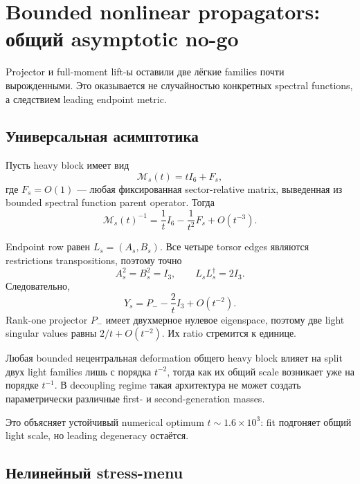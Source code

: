 \chapter{Bounded nonlinear propagators: общий asymptotic no-go}

Projector и full-moment lift-ы оставили две лёгкие families почти
вырожденными. Это оказывается не случайностью конкретных spectral functions,
а следствием leading endpoint metric.

\section{Универсальная асимптотика}

Пусть heavy block имеет вид
\begin{equation}
 \mathcal M_s(t)=tI_6+F_s,
\end{equation}
где \(F_s=O(1)\) --- любая фиксированная sector-relative matrix, выведенная
из bounded spectral function parent operator. Тогда
\begin{equation}
 \mathcal M_s(t)^{-1}=\frac1tI_6-\frac1{t^2}F_s+O(t^{-3}).
\end{equation}

Endpoint row равен \(L_s=(A_s,B_s)\). Все четыре torsor edges являются
restrictions transpositions, поэтому точно
\begin{equation}
 A_s^2=B_s^2=I_3,
 \qquad
 L_sL_s^\dagger=2I_3.
\end{equation}
Следовательно,
\begin{equation}
 Y_s=P_--\frac2tI_3+O(t^{-2}).
\end{equation}
Rank-one projector \(P_-\) имеет двухмерное нулевое eigenspace, поэтому две
light singular values равны \(2/t+O(t^{-2})\). Их ratio стремится к единице.

\begin{theorem}
Любая bounded нецентральная deformation общего heavy block влияет на split
двух light families лишь с порядка \(t^{-2}\), тогда как их общий scale
возникает уже на порядке \(t^{-1}\). В decoupling regime такая архитектура не
может создать параметрически различные first- и second-generation masses.
\end{theorem}

Это объясняет устойчивый numerical optimum \(t\sim1.6\times10^3\): fit
подгоняет общий light scale, но leading degeneracy остаётся.

\section{Нелинейный stress-menu}

